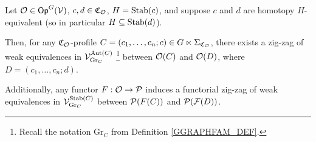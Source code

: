 \documentclass[a4paper,10pt
,draft
]{article}%
\renewcommand{\F}{\mathcal F}
\renewcommand{\1}{\eta}%
\begin{document}
\begin{lemma}
      \label{CAV_4.14_PROP1}
      Let $\O \in \Op^G(\V)$,
      $c,d \in \mathfrak C_\O$, 
      $H = \Stab(c)$, and suppose $c$ and $d$ are homotopy $H$-equivalent (so in particular $H \subseteq \Stab(d)$).
      
      Then, for any $\mathfrak C_\O$-profile $C = (c_1,\dots, c_n;c) \in G \ltimes \Sigma_{\mathfrak C_\O}$,
      there exists a zig-zag of weak equivalences in $\V^{\Aut(C)}_{\mathrm{Gr}_C}$
      \footnote{Recall the notation $\mathrm{Gr}_C$ from Definition \ref{GGRAPHFAM_DEF}.}
      between $\O(C)$ and $\O(D)$,
      where $D = (c_1,\dots, c_n;d)$.

      Additionally, any functor $F: \O \to \P$ induces a functorial zig-zag of weak equivalences in $\V^{\Stab(C)}_{\mathrm{Gr}_C}$
      between $\P(F(C))$ and $\P(\F(D))$.
\end{lemma}
\end{document}
